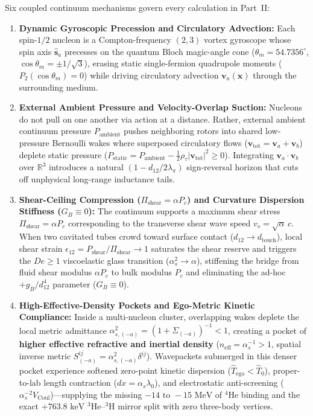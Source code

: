 \documentclass[11pt, a4paper]{article}
\DeclareRobustCommand{\dtouch}{d_{\mathrm{touch}}}
\begin{document}
Six coupled continuum mechanisms govern every calculation in Part~II:
\begin{enumerate}[leftmargin=1.8em, itemsep=3pt]
    \item \textbf{Dynamic Gyroscopic Precession and Circulatory Advection:} Each spin-$1/2$ nucleon is a Compton-frequency $(2,3)$ vortex gyroscope whose spin axis $\hat{\mathbf{s}}_a$ precesses on the quantum Bloch magic-angle cone ($\theta_m = 54.7356^\circ$, $\cos\theta_m = \pm 1/\sqrt{3}$), erasing static single-fermion quadrupole moments ($P_2(\cos\theta_m) = 0$) while driving circulatory advection $\mathbf{v}_a(\mathbf{x})$ through the surrounding medium.
    \item \textbf{External Ambient Pressure and Velocity-Overlap Suction:} Nucleons do not pull on one another via action at a distance. Rather, external ambient continuum pressure $P_{\mathrm{ambient}}$ pushes neighboring rotors into shared low-pressure Bernoulli wakes where superposed circulatory flows ($\mathbf{v}_{\mathrm{tot}} = \mathbf{v}_a + \mathbf{v}_b$) deplete static pressure ($P_{\mathrm{static}} = P_{\mathrm{ambient}} - \frac{1}{2}\rho_\tau|\mathbf{v}_{\mathrm{tot}}|^2 \ge 0$). Integrating $\mathbf{v}_a\cdot\mathbf{v}_b$ over $\mathbb{R}^3$ introduces a natural $(1 - d_{12}/2\lambda_\pi)$ sign-reversal horizon that cuts off unphysical long-range inductance tails.
    \item \textbf{Shear-Ceiling Compression ($\Pi_{\mathrm{shear}} = \alpha P_c$) and Curvature Dispersion Stiffness ($G_B \equiv 0$):} The continuum supports a maximum shear stress $\Pi_{\mathrm{shear}} = \alpha P_c$ corresponding to the transverse shear wave speed $v_s = \sqrt{\alpha}\,c$. When two cavitated tubes crowd toward surface contact ($d_{12} \to \dtouch$), local shear strain $\epsilon_{12} = P_{\mathrm{shear}}/\Pi_{\mathrm{shear}} \to 1$ saturates the shear reserve and triggers the $De \ge 1$ viscoelastic glass transition ($\alpha_s^2 \to \alpha$), stiffening the bridge from fluid shear modulus $\alpha P_c$ to bulk modulus $P_c$ and eliminating the ad-hoc $+g_B/d_{12}^4$ parameter ($G_B \equiv 0$).
    \item \textbf{High-Effective-Density Pockets and Ego-Metric Kinetic Compliance:} Inside a multi-nucleon cluster, overlapping wakes deplete the local metric admittance $\alpha_{s,(-a)}^2 = (1 + \Sigma_{(-a)})^{-1} < 1$, creating a pocket of \textbf{higher effective refractive and inertial density} ($n_{\mathrm{eff}} = \alpha_s^{-1} > 1$, spatial inverse metric $S_{(-a)}^{ij} = \alpha_{s,(-a)}^2\delta^{ij}$). Wavepackets submerged in this denser pocket experience softened zero-point kinetic dispersion ($\hat{T}_{\mathrm{ego}} < \hat{T}_0$), proper-to-lab length contraction ($dx = \alpha_s\lambda_0$), and electrostatic anti-screening ($\alpha_s^{-2}V_{\mathrm{Coul}}$)—supplying the missing $-14\text{ to }-15\text{ MeV}$ of $^4\text{He}$ binding and the exact $+763.8\text{ keV}$ $^3\text{He}\text{--}{}^3\text{H}$ mirror split with zero three-body vertices.

\end{enumerate}
\end{document}
